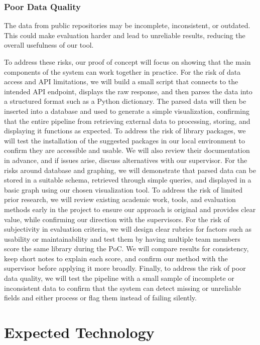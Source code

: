 \documentclass{article}
\begin{document}
\subsubsection*{Poor Data Quality}\vspace{-0.5em}
The data from public repositories may be incomplete, inconsistent, or outdated. This could make evaluation harder and lead to unreliable results, reducing the overall usefulness of our tool.

\vspace{1em} %
\noindent
To address these risks, our proof of concept will focus on showing that the main components of the system can work together in practice. For the risk of data access and API limitations, we will build a small script that connects to the intended API endpoint, displays the raw response, and then parses the data into a structured format such as a Python dictionary. The parsed data will then be inserted into a database and used to generate a simple visualization, confirming that the entire pipeline from retrieving external data to processing, storing, and displaying it functions as expected. To address the risk of library packages, we will test the installation of the suggested packages in our local environment to confirm they are accessible and usable. We will also review their documentation in advance, and if issues arise, discuss alternatives with our supervisor. For the risks around database and graphing, we will demonstrate that parsed data can be stored in a suitable schema, retrieved through simple queries, and displayed in a basic graph using our chosen visualization tool. To address the risk of limited prior research, we will review existing academic work, tools, and evaluation methods early in the project to ensure our approach is original and provides clear value, while confirming our direction with the supervisors. For the risk of subjectivity in evaluation criteria, we will design clear rubrics for factors such as usability or maintainability and test them by having multiple team members score the same library during the PoC. We will compare results for consistency, keep short notes to explain each score, and confirm our method with the supervisor before applying it more broadly. Finally, to address the risk of poor data quality, we will test the pipeline with a small sample of incomplete or inconsistent data to confirm that the system can detect missing or unreliable fields and either process or flag them instead of failing silently.

\section{Expected Technology}
\end{document}
